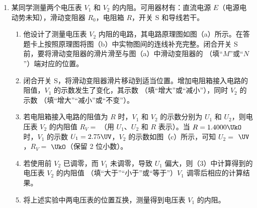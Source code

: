 \documentclass[\gkver]{gaokaozhenti}
\begin{document}
\begin{enumerate}
{\begin{enumerate}
	\item
	斜向上
\end{enumerate}
}


\item
某同学测量两个电压表 $V_{1}$ 和 $V_{2}$ 的内阻。可用器材有：直流电源 $E$（电源电动势未知），滑动变阻器 $R_{0}$，电阻箱 $R$，开关 S 和导线若干。


\begin{enumerate}
	\item
	他设计了测量电压表 $V_{2}$ 内阻的电路，其电路原理图如图（a）所示。在答题卡上按照原理图将图（b）中实物图间的连线补充完整\tkanswer[2cm]{}。闭合开关 S 前，要将滑动变阻器的滑片滑至与图（a）中滑动变阻器的 （填“$M$”或“$N$”）端对应的位置。
	\item
	闭合开关 S，将滑动变阻器滑片移动到适当位置。增加电阻箱接入电路的阻值，$V_{1}$ 的示数发生了变化，其示数 （填“增大”或“减小”），同时 $V_{2}$ 的示数 （填“增大”“减小”或“不变”）。
	\item
	若电阻箱接入电路的阻值为 $R$ 时，$V_{1}$ 和 $V_{2}$ 的示数分别为 $U_{1}$ 和 $U_{2}$，则电压表 $V_{2}$ 的内阻值 $R_{V}=$ （用 $U_{1}$、$U_{2}$ 和 $R$ 表示）。当 $R=1.4000\UkO$ 时，$V_{1}$ 的示数 $U_{1}=2.75\UV$，$V_{2}$ 的示数如图（c）所示，可知 $U_{2}=$  $\UV$，$R_{V}=$  $\UkO$（保留 2 位小数）。
	\item
	若使用前 $V_{2}$ 已调零，而 $V_{1}$ 未调零，导致 $U_{1}$ 偏大，则（3）中计算得到的电压表 $V_{2}$ 的内阻值 （填“大于”“小于”或“等于”）$V_{1}$ 调零后相应的计算结果。
	\item
	将上述实验中两电压表的位置互换，测量得到电压表 $V_{1}$ 的内阻。
\end{enumerate}


\end{enumerate}
\end{document}
